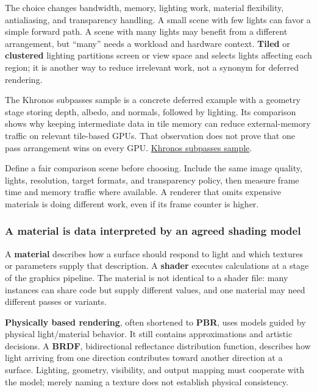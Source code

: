 The choice changes bandwidth, memory, lighting work, material flexibility, antialiasing, and transparency handling. A small scene with few lights can favor a simple forward path. A scene with many lights may benefit from a different arrangement, but ``many'' needs a workload and hardware context. \textbf{Tiled} or \textbf{clustered} lighting partitions screen or view space and selects lights affecting each region; it is another way to reduce irrelevant work, not a synonym for deferred rendering.

The Khronos subpasses sample is a concrete deferred example with a geometry stage storing depth, albedo, and normals, followed by lighting. Its comparison shows why keeping intermediate data in tile memory can reduce external-memory traffic on relevant tile-based GPUs. That observation does not prove that one pass arrangement wins on every GPU. \href{https://docs.vulkan.org/samples/latest/samples/performance/subpasses/README.html}{Khronos subpasses sample}.

Define a fair comparison scene before choosing. Include the same image quality, lights, resolution, target formats, and transparency policy, then measure frame time and memory traffic where available. A renderer that omits expensive materials is doing different work, even if its frame counter is higher.

\subsubsection{A material is data interpreted by an agreed shading model}\label{06-engine-ii-ch026-a-material-is-data-interpreted-by-an-agreed-shading-model}

\hypertarget{06-engine-ii-ch026-a-material-is-data-interpreted-by-an-agreed-shading-model}{}

A \textbf{material} describes how a surface should respond to light and which textures or parameters supply that description. A \textbf{shader} executes calculations at a stage of the graphics pipeline. The material is not identical to a shader file: many instances can share code but supply different values, and one material may need different passes or variants.

\textbf{Physically based rendering}, often shortened to \textbf{PBR}, uses models guided by physical light/material behavior. It still contains approximations and artistic decisions. A \textbf{BRDF}, bidirectional reflectance distribution function, describes how light arriving from one direction contributes toward another direction at a surface. Lighting, geometry, visibility, and output mapping must cooperate with the model; merely naming a texture  does not establish physical consistency.

